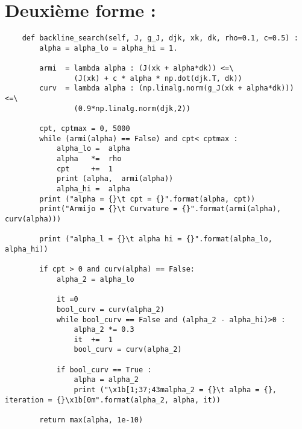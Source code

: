 \documentclass[a4paper,10pt]{article}
\numberwithin{equation}{section} %
\begin{document}
\section{Deuxième forme :}
\begin{lstlisting}
    def backline_search(self, J, g_J, djk, xk, dk, rho=0.1, c=0.5) :
        alpha = alpha_lo = alpha_hi = 1.
        
        armi  = lambda alpha : (J(xk + alpha*dk)) <=\
                (J(xk) + c * alpha * np.dot(djk.T, dk)) 
        curv  = lambda alpha : (np.linalg.norm(g_J(xk + alpha*dk))) <=\
                (0.9*np.linalg.norm(djk,2))  
        
        cpt, cptmax = 0, 5000
        while (armi(alpha) == False) and cpt< cptmax :
            alpha_lo =  alpha
            alpha   *=  rho
            cpt     +=  1
            print (alpha,  armi(alpha))
            alpha_hi =  alpha            
        print ("alpha = {}\t cpt = {}".format(alpha, cpt))
        print("Armijo = {}\t Curvature = {}".format(armi(alpha), curv(alpha)))
        
        print ("alpha_l = {}\t alpha hi = {}".format(alpha_lo, alpha_hi))
        
        if cpt > 0 and curv(alpha) == False:
            alpha_2 = alpha_lo
            
            it =0
            bool_curv = curv(alpha_2)
            while bool_curv == False and (alpha_2 - alpha_hi)>0 :
                alpha_2 *= 0.3        
                it  +=  1
                bool_curv = curv(alpha_2)           
                        
            if bool_curv == True :
                alpha = alpha_2
                print ("\x1b[1;37;43malpha_2 = {}\t alpha = {}, iteration = {}\x1b[0m".format(alpha_2, alpha, it))
                    
        return max(alpha, 1e-10)
\end{lstlisting}
\end{document}
